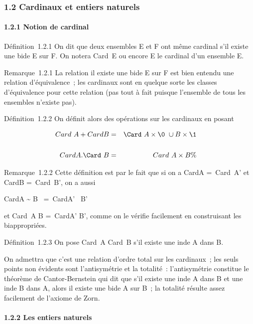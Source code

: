 
\subsubsection{1.2 Cardinaux et entiers naturels}

\paragraph{1.2.1 Notion de cardinal}

Définition~1.2.1 On dit que deux ensembles E et F ont même cardinal s'il
existe une bi\jmathection de E sur F. On notera
Card~E ou encore \textbar{}E\textbar{} le
cardinal d'un ensemble E.

Remarque~1.2.1 La relation il existe une bi\jmathection de E sur F est bien
entendu une relation d'équivalence~; les cardinaux sont en quelque sorte
les classes d'équivalence pour cette relation (pas tout à fait puisque
l'ensemble de tous les ensembles n'existe pas).

Définition~1.2.2 On définit alors des opérations sur les cardinaux en
posant

\begin{align*} Card~A
+ CardB& =& \Card~A
\times\0\ \cup B
\times\1\\%
\\
CardA.\Card~B& =&
Card~A \times B \%&
\\ \end{align*}

Remarque~1.2.2 Cette définition est  par le fait que si on a
CardA =\ Card~A' et
CardB =\ Card~B', on a
aussi

CardA \times\0\~ \cup
B \times\1\ =\
CardA' \times\0\ \cup B'
\times\1\

et Card~A \times B =\
CardA' \times B', comme on le vérifie facilement en construisant les
bi\jmathections appropriées.

Définition~1.2.3 On pose Card~A
\leq Card~B s'il existe une in\jmathection de A dans B.

On admettra que c'est une relation d'ordre total sur les cardinaux~; les
seuls points non évidents sont l'antisymétrie et la totalité~:
l'antisymétrie constitue le théorème de Cantor-Bernstein qui dit que
s'il existe une in\jmathection de A dans B et une in\jmathection de B dans A,
alors il existe une bi\jmathection de A sur B~; la totalité résulte assez
facilement de l'axiome de Zorn.

\paragraph{1.2.2 Les entiers naturels}

